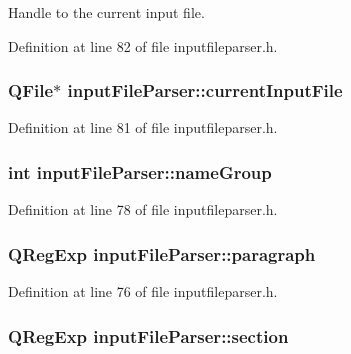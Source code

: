 Handle to the current input file. 



Definition at line 82 of file inputfileparser.\+h.

\hypertarget{classinput_file_parser_a09bd8a795ff58263e9afa2ff1200c4cc}{
\subsubsection[{current\+Input\+File}]{\setlength{\rightskip}{0pt plus 5cm}Q\+File$\ast$ input\+File\+Parser\+::current\+Input\+File\hspace{0.3cm}{\ttfamily [private]}}}\label{classinput_file_parser_a09bd8a795ff58263e9afa2ff1200c4cc}


Definition at line 81 of file inputfileparser.\+h.

\hypertarget{classinput_file_parser_a3f70a628f3cfbc541da8b90970f09db3}{
\subsubsection[{name\+Group}]{\setlength{\rightskip}{0pt plus 5cm}int input\+File\+Parser\+::name\+Group}}\label{classinput_file_parser_a3f70a628f3cfbc541da8b90970f09db3}


Definition at line 78 of file inputfileparser.\+h.

\hypertarget{classinput_file_parser_a2701509e686e9c80ff9ca419d4431dad}{
\subsubsection[{paragraph}]{\setlength{\rightskip}{0pt plus 5cm}Q\+Reg\+Exp input\+File\+Parser\+::paragraph}}\label{classinput_file_parser_a2701509e686e9c80ff9ca419d4431dad}


Definition at line 76 of file inputfileparser.\+h.

\hypertarget{classinput_file_parser_a7ab3cafcf0f20989346e4d73cc18de88}{
\subsubsection[{section}]{\setlength{\rightskip}{0pt plus 5cm}Q\+Reg\+Exp input\+File\+Parser\+::section}}\label{classinput_file_parser_a7ab3cafcf0f20989346e4d73cc18de88}


